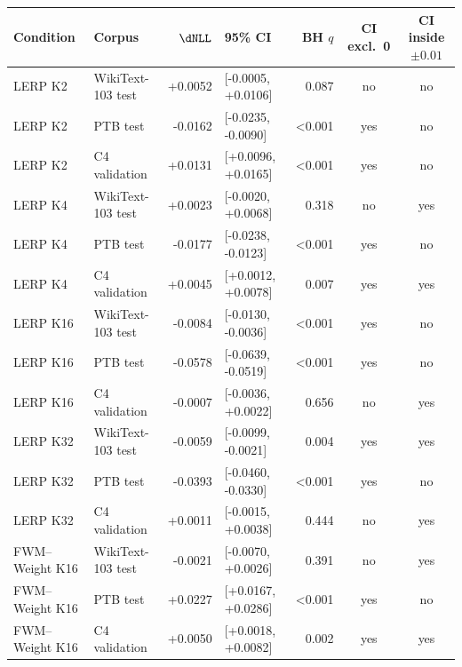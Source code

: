 \begin{tabular}{llrlrcc}
\toprule
Condition & Corpus & $\dNLL$ & 95\% CI & BH $q$ & CI excl.\ 0 & CI inside $\pm0.01$ \\
\midrule
LERP K2 & WikiText-103 test & +0.0052 & [-0.0005, +0.0106] & 0.087 & no & no \\
LERP K2 & PTB test & -0.0162 & [-0.0235, -0.0090] & <0.001 & yes & no \\
LERP K2 & C4 validation & +0.0131 & [+0.0096, +0.0165] & <0.001 & yes & no \\
LERP K4 & WikiText-103 test & +0.0023 & [-0.0020, +0.0068] & 0.318 & no & yes \\
LERP K4 & PTB test & -0.0177 & [-0.0238, -0.0123] & <0.001 & yes & no \\
LERP K4 & C4 validation & +0.0045 & [+0.0012, +0.0078] & 0.007 & yes & yes \\
LERP K16 & WikiText-103 test & -0.0084 & [-0.0130, -0.0036] & <0.001 & yes & no \\
LERP K16 & PTB test & -0.0578 & [-0.0639, -0.0519] & <0.001 & yes & no \\
LERP K16 & C4 validation & -0.0007 & [-0.0036, +0.0022] & 0.656 & no & yes \\
LERP K32 & WikiText-103 test & -0.0059 & [-0.0099, -0.0021] & 0.004 & yes & yes \\
LERP K32 & PTB test & -0.0393 & [-0.0460, -0.0330] & <0.001 & yes & no \\
LERP K32 & C4 validation & +0.0011 & [-0.0015, +0.0038] & 0.444 & no & yes \\
FWM--Weight K16 & WikiText-103 test & -0.0021 & [-0.0070, +0.0026] & 0.391 & no & yes \\
FWM--Weight K16 & PTB test & +0.0227 & [+0.0167, +0.0286] & <0.001 & yes & no \\
FWM--Weight K16 & C4 validation & +0.0050 & [+0.0018, +0.0082] & 0.002 & yes & yes \\
\bottomrule
\end{tabular}
